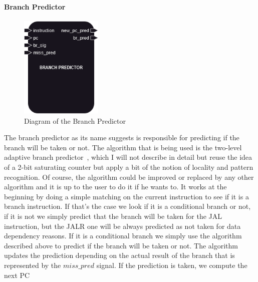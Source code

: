 \paragraph{Branch Predictor}

\begin{figure}[H]
    \centering
    \includegraphics[width=0.35\textwidth]{design/pipelined/fetch/images/br_predictor.png}
    \caption{Diagram of the Branch Predictor}
    \label{fig:br_predictor}
\end{figure}

The branch predictor as its name suggests is responsible for predicting if the branch will be taken or not. The algorithm that 
is being used is the two-level adaptive branch predictor~\cite{two_level_adaptive}, which I will not describe in detail but reuse the idea of a 
2-bit saturating counter but apply a bit of the notion of locality and pattern recognition. Of course, the algorithm
could be improved or replaced by any other algorithm and it is up to the user to do it if he wants to.
It works at the beginning by doing a simple matching on the current instruction to see if it is a branch instruction.
If that's the case we look if it is a conditional branch or not, if it is not we simply predict that the branch will be taken for 
the JAL instruction, but the JALR one will be always predicted as not taken for data dependency reasons. If it is a conditional branch
we simply use the algorithm described above to predict if the branch will be taken or not. The algorithm updates the prediction depending 
on the actual result of the branch that is represented by the $miss\_pred$ signal. If the prediction is taken, we compute the next PC \\

